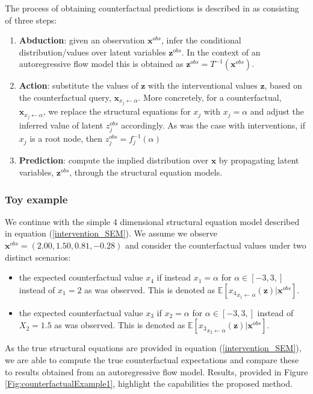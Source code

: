 \documentclass{article}
\begin{document}
The process of obtaining counterfactual predictions is described in 
\cite{pearl2009causal} as consisting of three steps:
\begin{enumerate}
	\item \textbf{Abduction}: given an observation $\mathbf{x}^{obs}$, infer the conditional distribution/values over 
	latent variables $\mathbf{z}^{obs}$. 
	In the context of an autoregressive flow model this is obtained as $\mathbf{z}^{obs}= T^{-1} ( \mathbf{x}^{obs} )$. 
	\item \textbf{Action}: substitute
	the values of $\mathbf{z}$ 
	with the interventional values $\mathbf{z}$, 
	based on the counterfactual query, $\mathbf{x}_{x_j \leftarrow \alpha}$.
	More concretely, for a counterfactual, $\mathbf{x}_{x_j \leftarrow \alpha}$, we 
	replace the 
	structural equations for $x_j$ with 
	$x_j = \alpha$ and 
	adjust the inferred value of latent $z^{obs}_j$ accordingly. 
	As was the case with interventions, 
	if $x_j$ is a root node, then $z^{obs}_j = f_j^{-1}( \alpha )$
	
	\item \textbf{Prediction}:  compute the implied distribution over $\mathbf{x}$ by propagating latent variables, $\mathbf{z}^{obs}$, 
	through the structural equation models. 
\end{enumerate}



\subsubsection*{Toy example}
We continue with the simple 4 dimensional structural equation model
described in equation (\ref{intervention_SEM}). 
We assume we observe $\mathbf{x}^{obs} = (2.00  ,  1.50 ,  0.81, -0.28)$
and consider the counterfactual 
values under two distinct scenarios:
\begin{itemize}
	\item  the expected counterfactual value $x_4$ if 
	instead $x_1=\alpha$ for $\alpha \in [-3,3,]$ instead of
	$x_1=2$ as was observed. This is denoted as $\mathbb{E}[{x_4}_{x_1\leftarrow \alpha}(\mathbf{z}) | \mathbf{x}^{obs}]$.
	\item the expected counterfactual value $x_3$ if $x_2=\alpha$ for $\alpha \in [-3,3,]$ instead of
	$X_2=1.5$ as was observed. This is denoted as $\mathbb{E}[{x_3}_{x_2\leftarrow \alpha}(\mathbf{z}) | \mathbf{x}^{obs} ]$.
\end{itemize}
%
As the true structural equations are provided in equation (\ref{intervention_SEM}), we are able to
compute the true counterfactual expectations and compare these to 
results obtained from an autoregressive flow model. Results, provided in Figure \ref{Fig:counterfactualExample1}, 
highlight the capabilities the proposed method.  
\end{document}
